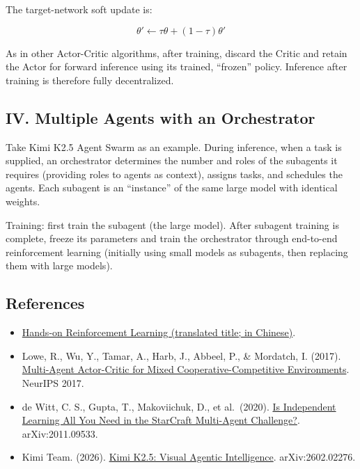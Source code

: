 The target-network soft update is:

\[
\theta'
\leftarrow
\tau\theta+(1-\tau)\theta'
\]

As in other Actor-Critic algorithms, after training, discard the Critic and retain the Actor for forward inference using its trained, ``frozen'' policy. Inference after training is therefore fully decentralized.

\hypertarget{iv.-multiple-agents-with-an-orchestrator}{%
\subsection{IV. Multiple Agents with an Orchestrator}\label{iv.-multiple-agents-with-an-orchestrator}}

Take Kimi K2.5 Agent Swarm as an example. During inference, when a task is supplied, an orchestrator determines the number and roles of the subagents it requires (providing roles to agents as context), assigns tasks, and schedules the agents. Each subagent is an ``instance'' of the same large model with identical weights.

Training: first train the subagent (the large model). After subagent training is complete, freeze its parameters and train the orchestrator through end-to-end reinforcement learning (initially using small models as subagents, then replacing them with large models).

\FloatBarrier
{}
\hypertarget{references-65}{%
\subsection{References}\label{references-65}}

\vspace{0.25em}
\begin{itemize}
\tightlist
\item
  \href{https://hrl.boyuai.com/}{Hands-on Reinforcement Learning (translated title; in Chinese)}.
\item
  Lowe, R., Wu, Y., Tamar, A., Harb, J., Abbeel, P., \& Mordatch, I. (2017). \href{https://arxiv.org/abs/1706.02275}{Multi-Agent Actor-Critic for Mixed Cooperative-Competitive Environments}. NeurIPS 2017.
\item
  de Witt, C. S., Gupta, T., Makoviichuk, D., et al.~(2020). \href{https://arxiv.org/abs/2011.09533}{Is Independent Learning All You Need in the StarCraft Multi-Agent Challenge?}. arXiv:2011.09533.
\item
  Kimi Team. (2026). \href{https://arxiv.org/abs/2602.02276}{Kimi K2.5: Visual Agentic Intelligence}. arXiv:2602.02276.
\end{itemize}

\clearpage
